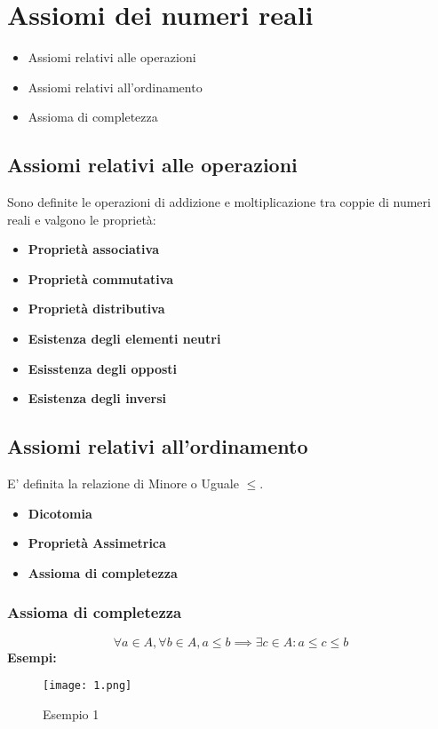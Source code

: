 \documentclass[../../main.tex]{subfiles}
\begin{document}
\section{Assiomi dei numeri reali}
\begin{itemize}
    \item Assiomi relativi alle operazioni
    \item Assiomi relativi all'ordinamento
    \item Assioma di completezza
\end{itemize}

\subsection{Assiomi relativi alle operazioni}
Sono definite le operazioni di addizione e moltiplicazione tra coppie di numeri
reali e valgono le proprietà:
\begin{itemize}
    \item \textbf{Proprietà associativa}
    \item \textbf{Proprietà commutativa}
    \item \textbf{Proprietà distributiva}
    \item \textbf{Esistenza degli elementi neutri}
    \item \textbf{Esisstenza degli opposti}
    \item \textbf{Esistenza degli inversi}
\end{itemize}

\subsection{Assiomi relativi all'ordinamento}
E' definita la relazione di Minore o Uguale $\leq$.
\begin{itemize}
    \item \textbf{Dicotomia}
    \item \textbf{Proprietà Assimetrica}
    \item \textbf{Assioma di completezza}
\end{itemize}

\subsubsection{Assioma di completezza}
\[
    \forall a \in A, \forall b \in A, a \leq b  \implies \exists c \in A : a \leq c \leq b
\]
\textbf{Esempi:}\\
\begin{figure}[h]
    \centering
    \texttt{[image: 1.png]}
    \caption{Esempio 1}
    \label{fig:1}
\end{figure}
\end{document}
